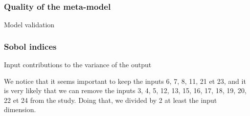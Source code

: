 \documentclass[8pt]{beamer}
\begin{document}
\begin{frame}
  \frametitle{Quality of the meta-model}
  \begin{center}

    Model validation
  \end{center}
\end{frame}

\begin{frame}
  \frametitle{Sobol indices}
\small
  \begin{center}

    Input contributions to the variance of the output
  \end{center}
  We notice that it seems important to keep the inputs 6, 7, 8, 11, 21 et 23, and it is very likely that we can remove the inputs 3, 4, 5, 12, 13, 15, 16, 17, 18, 19, 20, 22 et 24 from the study. Doing that,  we divided  by 2 at least the input dimension.
\end{frame}
\end{document}
